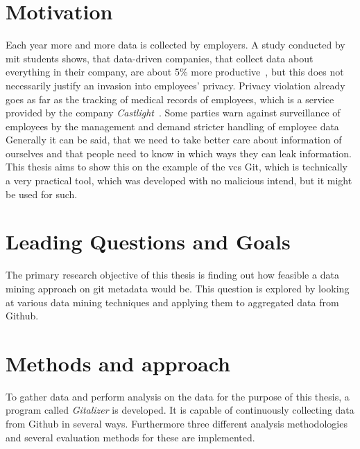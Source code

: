 \section{Motivation}
Each year more and more data is collected by employers.
A study conducted by \ac{mit} students shows, that data-driven companies, that collect data about everything in their company, are about 5\% more productive~\cite{article:management-revolution}, but this does not necessarily justify an invasion into employees' privacy.
Privacy violation already goes as far as the tracking of medical records of employees, which is a service provided by the company \emph{Castlight}~\cite{article:medical-data}.
Some parties warn against surveillance of employees by the management and demand stricter handling of employee data~\cite{article:vermessung-belegschaft}
Generally it can be said, that we need to take better care about information of ourselves and that people need to know in which ways they can leak information.
This thesis aims to show this on the example of the \ac{vcs} Git, which is technically a very practical tool, which was developed with no malicious intend, but it might be used for such.

\section{Leading Questions and Goals}

The primary research objective of this thesis is finding out how feasible a data mining approach on git metadata would be.
This question is explored by looking at various data mining techniques and applying them to aggregated data from Github.

\section{Methods and approach}

To gather data and perform analysis on the data for the purpose of this thesis, a program called \emph{Gitalizer} is developed.
It is capable of continuously collecting data from Github in several ways.
Furthermore three different analysis methodologies and several evaluation methods for these are implemented.
